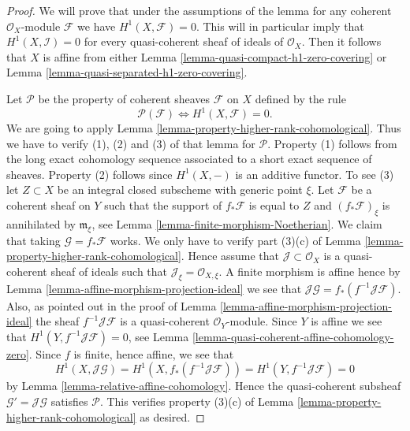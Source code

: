 \begin{proof}
We will prove that under the assumptions of the lemma for any coherent
$\mathcal{O}_X$-module $\mathcal{F}$ we have $H^1(X, \mathcal{F}) = 0$.
This will in particular imply that $H^1(X, \mathcal{I}) = 0$
for every quasi-coherent sheaf of ideals of $\mathcal{O}_X$. Then it
follows that $X$ is affine from either
Lemma \ref{lemma-quasi-compact-h1-zero-covering} or
Lemma \ref{lemma-quasi-separated-h1-zero-covering}.

\medskip\noindent
Let $\mathcal{P}$ be the property of coherent sheaves
$\mathcal{F}$ on $X$ defined by the rule
$$
\mathcal{P}(\mathcal{F}) \Leftrightarrow H^1(X, \mathcal{F}) = 0.
$$
We are going to apply Lemma \ref{lemma-property-higher-rank-cohomological}.
Thus we have to verify (1), (2) and (3) of that lemma for $\mathcal{P}$.
Property (1) follows from the long exact cohomology sequence associated
to a short exact sequence of sheaves. Property (2) follows since
$H^1(X, -)$ is an additive functor. To see (3) let $Z \subset X$ be
an integral closed subscheme with generic point $\xi$.
Let $\mathcal{F}$ be a coherent sheaf on $Y$ such that
the support of $f_*\mathcal{F}$ is equal to $Z$
and $(f_*\mathcal{F})_\xi$ is annihilated by $\mathfrak m_\xi$,
see Lemma \ref{lemma-finite-morphism-Noetherian}. We claim that
taking $\mathcal{G} = f_*\mathcal{F}$ works. We only have to verify
part (3)(c) of Lemma \ref{lemma-property-higher-rank-cohomological}.
Hence assume that $\mathcal{J} \subset \mathcal{O}_X$ is a
quasi-coherent sheaf of ideals such that
$\mathcal{J}_\xi = \mathcal{O}_{X, \xi}$.
A finite morphism is affine hence by
Lemma \ref{lemma-affine-morphism-projection-ideal} we see that
$\mathcal{J}\mathcal{G} = f_*(f^{-1}\mathcal{J}\mathcal{F})$.
Also, as pointed out in the proof of
Lemma \ref{lemma-affine-morphism-projection-ideal} the sheaf
$f^{-1}\mathcal{J}\mathcal{F}$ is a quasi-coherent $\mathcal{O}_Y$-module.
Since $Y$ is affine we see that $H^1(Y, f^{-1}\mathcal{J}\mathcal{F}) = 0$,
see Lemma \ref{lemma-quasi-coherent-affine-cohomology-zero}.
Since $f$ is finite, hence affine, we see that
$$
H^1(X, \mathcal{J}\mathcal{G}) =
H^1(X, f_*(f^{-1}\mathcal{J}\mathcal{F})) =
H^1(Y, f^{-1}\mathcal{J}\mathcal{F}) = 0
$$
by Lemma \ref{lemma-relative-affine-cohomology}.
Hence the quasi-coherent subsheaf $\mathcal{G}' = \mathcal{J}\mathcal{G}$
satisfies $\mathcal{P}$. This verifies property (3)(c) of
Lemma \ref{lemma-property-higher-rank-cohomological} as desired.
\end{proof}












